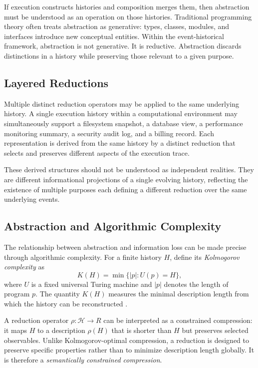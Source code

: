 \documentclass[12pt]{article}
\begin{document}
If execution constructs histories and composition merges them, then abstraction must be
understood as an operation on those histories. Traditional programming theory often treats
abstraction as generative: types, classes, modules, and interfaces introduce new conceptual
entities. Within the event-historical framework, abstraction is not generative. It is
reductive. Abstraction discards distinctions in a history while preserving those relevant to
a given purpose.

\subsection{Layered Reductions}

Multiple distinct reduction operators may be applied to the same underlying history. A single
execution history within a computational environment may simultaneously support a filesystem
snapshot, a database view, a performance monitoring summary, a security audit log, and a
billing record. Each representation is derived from the same history by a distinct reduction
that selects and preserves different aspects of the execution trace.

These derived structures should not be understood as independent realities. They are different
informational projections of a single evolving history, reflecting the existence of multiple
purposes each defining a different reduction over the same underlying events.

\subsection{Abstraction and Algorithmic Complexity}

The relationship between abstraction and information loss can be made precise through
algorithmic complexity. For a finite history $H$, define its \emph{Kolmogorov complexity} as
\[
K(H) = \min \{ |p| : U(p) = H \},
\]
where $U$ is a fixed universal Turing machine and $|p|$ denotes the length of program $p$. The
quantity $K(H)$ measures the minimal description length from which the history can be
reconstructed \cite{li2008}.

A reduction operator $\rho : \mathcal{H} \rightarrow R$ can be interpreted as a constrained
compression: it maps $H$ to a description $\rho(H)$ that is shorter than $H$ but preserves
selected observables. Unlike Kolmogorov-optimal compression, a reduction is designed to
preserve specific properties rather than to minimize description length globally. It is
therefore a \emph{semantically constrained compression}.
\end{document}
